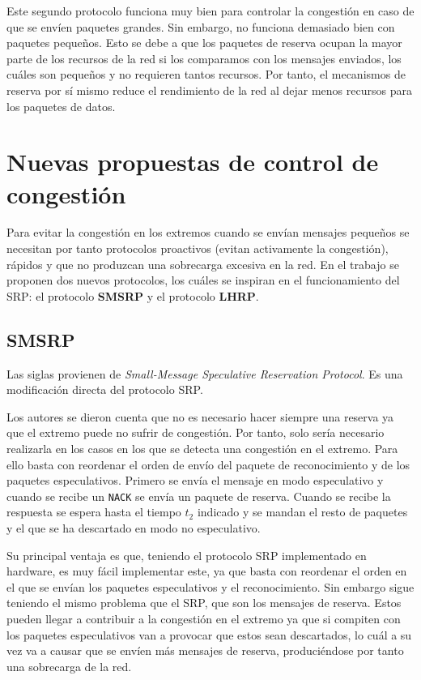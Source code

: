 \documentclass[11pt,a4paper]{article}
\begin{document}
Este segundo protocolo funciona muy bien para controlar la congestión
en caso de que se envíen paquetes grandes. Sin embargo, no funciona demasiado bien con paquetes
pequeños. Esto se debe a que los paquetes de reserva ocupan la mayor parte de los recursos de
la red si los comparamos con los mensajes enviados, los cuáles son pequeños y no requieren tantos
recursos. Por tanto, el mecanismos de reserva por sí mismo reduce el rendimiento de la red al
dejar menos recursos para los paquetes de datos.

\section{Nuevas propuestas de control de congestión}

Para evitar la congestión en los extremos cuando se envían mensajes pequeños se necesitan por
tanto protocolos proactivos (evitan activamente la congestión), rápidos y que no produzcan
una sobrecarga excesiva en la red. En el trabajo se proponen dos nuevos protocolos, los cuáles
se inspiran en el funcionamiento del SRP: el protocolo \textbf{SMSRP} y el protocolo
\textbf{LHRP}.

\subsection{SMSRP}

Las siglas provienen de
\textit{Small-Message Speculative Reservation Protocol}.
Es una modificación directa del protocolo SRP.

Los autores se dieron cuenta que no es necesario hacer siempre una reserva ya que el extremo
puede no sufrir de congestión. Por tanto, solo sería necesario realizarla en los casos en los
que se detecta una congestión en el extremo. Para ello basta
con reordenar el orden de envío del paquete de reconocimiento y de los paquetes especulativos.
Primero se envía el mensaje en modo especulativo y cuando se recibe un \texttt{NACK} se envía un
paquete de reserva. Cuando se recibe la respuesta se espera hasta el tiempo $t_2$ indicado y se
mandan el resto de paquetes y el que se ha descartado en modo no especulativo.

Su principal ventaja es que, teniendo el protocolo SRP implementado en hardware, es muy fácil
implementar este, ya que basta con reordenar el orden en el que se envían los paquetes
especulativos y el reconocimiento. Sin embargo sigue teniendo el mismo problema que el SRP,
que son los mensajes de reserva. Estos pueden llegar a contribuir a la congestión en el extremo
ya que si compiten con los paquetes especulativos van a provocar que estos sean descartados, lo
cuál a su vez va a causar que se envíen más mensajes de reserva, produciéndose por tanto
una sobrecarga de la red.
\end{document}
